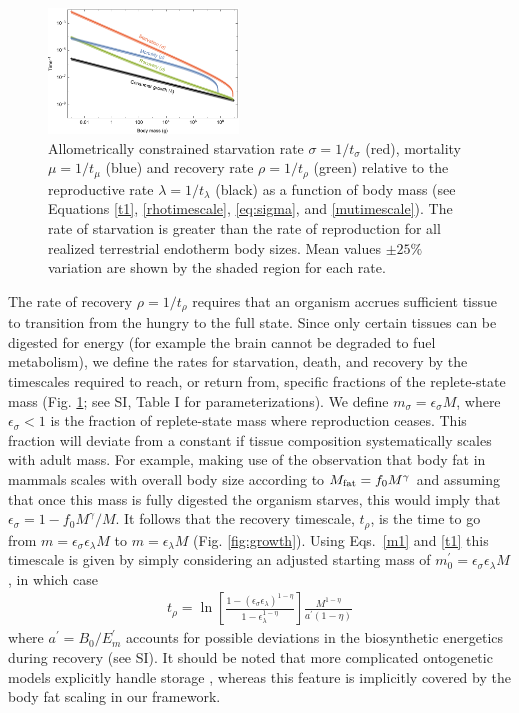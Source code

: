 \documentclass[twocolumn,preprintnumbers,amsmath,amssymb,superscriptaddress]{revtex4}
\begin{document}
\begin{bibunit}[unsrt]
\begin{figure}
\centering
\includegraphics[width=0.45\textwidth]{fig_Rates.pdf}
\caption{
Allometrically constrained starvation rate $\sigma=1/t_{\sigma}$ (red), mortality $\mu=1/t_{\mu}$ (blue) and recovery rate $\rho=1/t_{\rho}$ (green) relative to the reproductive rate $\lambda=1/t_{\lambda}$ (black) as a function of body mass (see Equations \ref{t1}, \ref{rhotimescale}, \ref{eq:sigma}, and \ref{mutimescale}).
The rate of starvation is greater than the rate of reproduction for all realized terrestrial endotherm body sizes.
Mean values $\pm 25\%$ variation are shown by the shaded region for each rate.
}
\label{fig:gvs}
\end{figure}

The rate of recovery $\rho = 1/t_\rho$ requires that an organism accrues
sufficient tissue to transition from the hungry to the full state.  Since
only certain tissues can be digested for energy (for example the brain cannot
be degraded to fuel metabolism), we define the rates for starvation, death,
and recovery by the timescales required to reach, or return from, specific
fractions of the replete-state mass (Fig. \ref{fig:gvs}; see SI, Table I for parameterizations).  We define
$m_{\sigma}=\epsilon_{\sigma} M$, where $\epsilon_{\sigma}<1$ is the fraction of
replete-state mass where reproduction ceases. This fraction will deviate from a constant
if tissue composition systematically scales with adult mass.  For example,
making use of the observation that body fat in mammals scales with overall
body size according to $M_{\rm fat}=f_{0}M^{\gamma}$ and assuming that once
this mass is fully digested the organism starves, this would imply that
$\epsilon_{\sigma}=1-f_{0}M^{\gamma}/M$. It follows that the
recovery timescale, $t_{\rho}$, is the time to go from
$m=\epsilon_{\sigma} \epsilon_{\lambda} M$ to $m=\epsilon_{\lambda}M$ (Fig. \ref{fig:growth}). Using Eqs.~\eqref{m1} and \eqref{t1} this timescale is given by simply considering an adjusted starting mass of $m_{0}^{\prime}=\epsilon_{\sigma}\epsilon_{\lambda}M$, in which case
\begin{eqnarray}
\label{rhotimescale}
t_{\rho}=\ln\left[\frac{1-\left(\epsilon_{\sigma}\epsilon_{\lambda}\right)^{1-\eta}}{1-\epsilon_\lambda^{1-\eta}}\right]\frac{M^{1-\eta}}{a^{\prime}\left(1-\eta\right)}
\end{eqnarray}
where $a^{\prime}=B_{0}/E_{m}^{\prime}$ accounts for possible deviations in the biosynthetic energetics during recovery (see SI). It should be noted that more complicated ontogenetic models explicitly handle
storage \cite{hou}, whereas this feature is implicitly covered by the body
fat scaling in our framework.


\end{bibunit}
\end{document}

